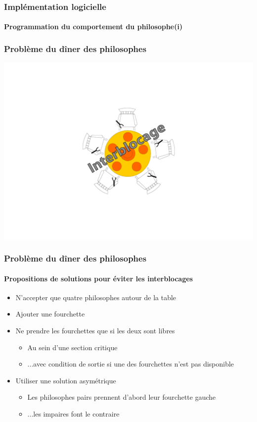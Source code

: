 \begin{frame}
\frametitle{Implémentation logicielle}
\framesubtitle{Programmation du comportement du philosophe(i)}
\begin{scriptsize}

\end{scriptsize}
\end{frame}

\begin{frame}
\frametitle{Problème du dîner des philosophes}
\begin{center}
\includegraphics[height=.9\textheight]{../illustration/diner_philosophes_ib.pdf}
\end{center}
\end{frame}

\begin{frame}
\frametitle{Problème du dîner des philosophes}
\framesubtitle{Propositions de solutions pour éviter les interblocages}
\begin{itemize}
\item <1-> N’accepter que quatre philosophes autour de la table
\item <2-> Ajouter une fourchette
\item <3-> Ne prendre les fourchettes que si les deux sont libres
\begin{itemize}
\item Au sein d’une section critique
\item ...avec condition de sortie si une des fourchettes n'est pas disponible
\end{itemize}
\item <4-> Utiliser une solution asymétrique
\begin{itemize}
\item Les philosophes pairs prennent d’abord leur fourchette gauche
\item ...les impaires font le contraire
\end{itemize}
\end{itemize}
\end{frame}

